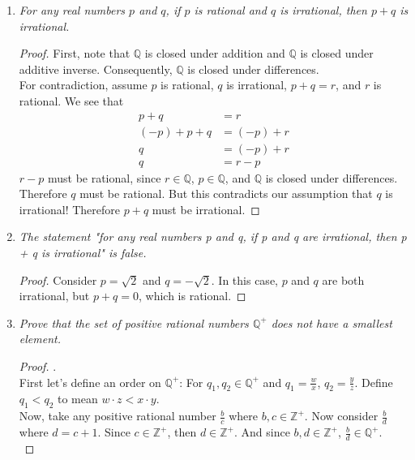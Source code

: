 \documentclass{amsart}
\begin{document}
\begin{enumerate}[1.]
\newpage

\item \emph{For any real numbers $p$ and $q$, if $p$ is rational and 
$q$ is irrational, then $p + q$ is irrational.}
\begin{proof}
First, note that $\mathbb{Q}$ is closed under addition and $\mathbb{Q}$ 
is closed under additive inverse. Consequently, $\mathbb{Q}$ is 
closed under differences. \\

For contradiction, assume $p$ is rational, $q$ is irrational, 
$p + q = r$, and $r$ is rational. We see that
\begin{align*}
    p + q &= r \\
    (-p) + p + q &= (-p) + r \\
    q &= (-p) + r \\
    q &= r - p
\end{align*}
$r - p$ must be rational, since $r\in\mathbb{Q}$, $p\in\mathbb{Q}$, and
$\mathbb{Q}$ is closed under differences. Therefore $q$ must be 
rational. But this contradicts our assumption that
$q$ is irrational! Therefore $p + q$ must be irrational.
\end{proof}

\newpage

\item \emph{The statement "for any real numbers p and q, if p and q are irrational, then p + q is irrational" is false.}
\begin{proof}
Consider $p = \sqrt{2}$ and $q = -\sqrt{2}$. In this case, $p$ and $q$ are 
both irrational, but $p + q = 0$, which is rational.

\end{proof}


\newpage

\item \emph{Prove that the set of positive rational numbers $\mathbb{Q}^+$ does not have a smallest element.}
\begin{proof} .\\

First let's define an order on $\mathbb{Q}^+$:
For $q_1, q_2\in\mathbb{Q}^+$ and $q_1=\frac{w}{x}$, 
$q_2=\frac{y}{z}$. Define $q_1 < q_2$ to mean $w\cdot z < x\cdot y$. \\

Now, take any positive rational number $\frac{b}{c}$ 
where $b,c\in\mathbb{Z}^+$. Now consider $\frac{b}{d}$ where $d=c+1$. 
Since $c\in\mathbb{Z}^+$, then $d\in\mathbb{Z}^+$. And since 
$b,d\in\mathbb{Z}^+$, $\frac{b}{d}\in\mathbb{Q}^+$. \\


\end{proof}
\end{enumerate}
\end{document}
